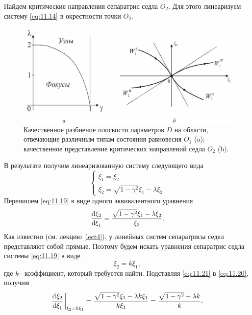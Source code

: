 Найдем критические направления сепаратрис седла $O_{2}$. Для этого линеаризуем систему \eqref{eq:11.14}
в окрестности точки $O_{2}$.
\begin{figure}[h]
        \centering
        \includegraphics[width=\linewidth]{fig/lect11/3}
        \caption{Качественное разбиение плоскости параметров $D$ 
        на области, отвечающие различным типам состояния равновесия $O_{1}$ (a); качественное
представление критических направлений седла $O_{2}$ (b).}
        \label{fig:11.3}
\end{figure}
В результате получим линеаризованную систему следующего вида
\begin{equation}
        \label{eq:11.19}
        \begin{cases}
                \dot \xi_{1} = \xi_{2} \\
                \dot \xi_{2} = \sqrt{1 - \gamma^2} \xi_{1} - \lambda \xi_{2}
        \end{cases}
\end{equation}
Перепишем \eqref{eq:11.19} в виде одного эквивалентного уравнения
\begin{equation}
        \label{eq:11.20}
        \dv[]{\xi_{2}}{\xi_{1}} = \frac{ \sqrt{ 1 - \gamma^2} \xi_{1} - \lambda \xi_{2}}{\xi_{2}}.
\end{equation}
Как известно (см. лекцию \ref{lect4}), у линейных систем сепаратрисы седел представляют 
собой прямые. Поэтому будем искать уравнения сепаратрис седла системы \eqref{eq:11.19} в
виде
\begin{equation}
        \label{eq:11.21}
        \xi_{2}=k \xi_{1},
\end{equation}
где $k$-- коэффициент, который требуется найти.
Подставляя \eqref{eq:11.21} в \eqref{eq:11.20}, получим
\begin{equation}
        \label{eq:11.22}
        \dv[]{\xi_{2}}{\xi_{1}}\eval_{\xi_{2}=k\xi_{1}} = 
        \frac{\sqrt{1 - \gamma^2} \xi_{1} - \lambda k \xi_{1}}{k\xi_{1}}
        = \frac{\sqrt{1-\gamma^2} - \lambda k}{k}.
\end{equation}
